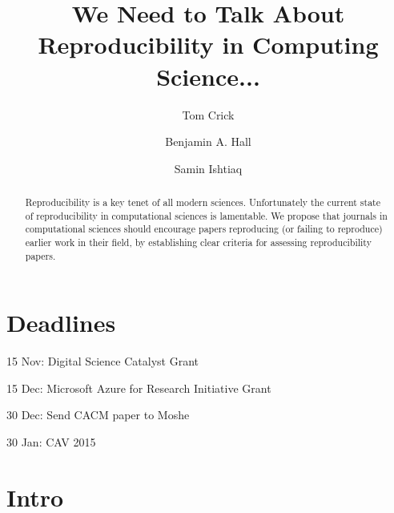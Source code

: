 \documentclass[a4paper,11pt]{article}
\begin{document}
\title{We Need to Talk About Reproducibility in Computing Science...}

\author[1]{Tom Crick}
\author[2]{Benjamin A. Hall}
\author[3]{Samin Ishtiaq}




\date{ }
\maketitle

\begin{abstract}
Reproducibility is a key tenet of all modern sciences.  Unfortunately
the current state of reproducibility in computational sciences is
lamentable.  We propose that journals in computational sciences should
encourage papers reproducing (or failing to reproduce) earlier work in
their field, by establishing clear criteria for assessing
reproducibility papers.
\end{abstract}


\section*{Deadlines}
\begin{compactdesc}
\item[15 Nov:] Digital Science Catalyst Grant
\item[15 Dec:] Microsoft Azure for Research Initiative Grant
\item[30 Dec:] Send CACM paper to Moshe
\item[30 Jan:] CAV 2015
\end{compactdesc}

\section{Intro}
\end{document}
